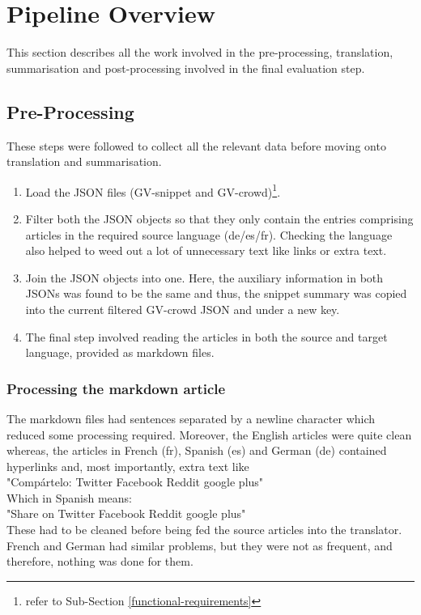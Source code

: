 \documentclass[12pt,a4paper,twoside,openright]{report}
\newcommand{\red}[1]{\textcolor{red}{#1}}
\newcommand{\changedFont}[1]{{\fontfamily{qcr}\selectfont #1}}
\begin{document}

\section{Pipeline Overview}
\label{pipeline-overview}
This section describes all the work involved in the pre-processing, translation, summarisation and post-processing involved in the final evaluation step.

\subsection{Pre-Processing}
\label{preprocessing}
These steps were followed to collect all the relevant data before moving onto translation and summarisation.
\begin{enumerate}
    \item Load the JSON files (GV-snippet and GV-crowd)\footnote{refer to Sub-Section \ref{functional-requirements}}.
    \item Filter both the JSON objects so that they only contain the entries comprising articles in the required source language (de/es/fr). Checking the language also helped to weed out a lot of unnecessary text like links or extra text.
    \item Join the JSON objects into one. Here, the auxiliary information in both JSONs was found to be the same and thus, the snippet summary was copied into the current filtered GV-crowd JSON and under a new key.
    \item The final step involved reading the articles in both the source and target language, provided as markdown files.
\end{enumerate}

\subsubsection{Processing the markdown article}
The markdown files had sentences separated by a newline character which reduced some processing required.
Moreover, the English articles were quite clean whereas, the articles in French (fr), Spanish (es) and German (de) contained hyperlinks and, most importantly, extra text like \\
\changedFont{"Compártelo: Twitter Facebook Reddit google plus"}\\
Which in Spanish means: \\
\changedFont{"Share on Twitter Facebook Reddit google plus"}\\
These had to be cleaned before being fed the source articles into the translator. French and German had similar problems, but they were not as frequent, and therefore, nothing was done for them.
\end{document}
